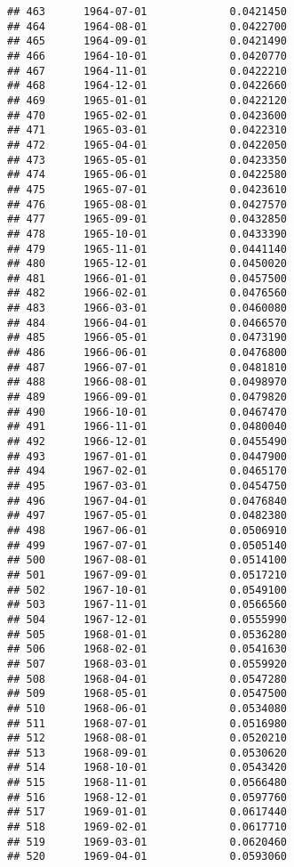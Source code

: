 \documentclass[
]{article}
\begin{document}
\begin{verbatim}
## 463      1964-07-01             0.0421450
## 464      1964-08-01             0.0422700
## 465      1964-09-01             0.0421490
## 466      1964-10-01             0.0420770
## 467      1964-11-01             0.0422210
## 468      1964-12-01             0.0422660
## 469      1965-01-01             0.0422120
## 470      1965-02-01             0.0423600
## 471      1965-03-01             0.0422310
## 472      1965-04-01             0.0422050
## 473      1965-05-01             0.0423350
## 474      1965-06-01             0.0422580
## 475      1965-07-01             0.0423610
## 476      1965-08-01             0.0427570
## 477      1965-09-01             0.0432850
## 478      1965-10-01             0.0433390
## 479      1965-11-01             0.0441140
## 480      1965-12-01             0.0450020
## 481      1966-01-01             0.0457500
## 482      1966-02-01             0.0476560
## 483      1966-03-01             0.0460080
## 484      1966-04-01             0.0466570
## 485      1966-05-01             0.0473190
## 486      1966-06-01             0.0476800
## 487      1966-07-01             0.0481810
## 488      1966-08-01             0.0498970
## 489      1966-09-01             0.0479820
## 490      1966-10-01             0.0467470
## 491      1966-11-01             0.0480040
## 492      1966-12-01             0.0455490
## 493      1967-01-01             0.0447900
## 494      1967-02-01             0.0465170
## 495      1967-03-01             0.0454750
## 496      1967-04-01             0.0476840
## 497      1967-05-01             0.0482380
## 498      1967-06-01             0.0506910
## 499      1967-07-01             0.0505140
## 500      1967-08-01             0.0514100
## 501      1967-09-01             0.0517210
## 502      1967-10-01             0.0549100
## 503      1967-11-01             0.0566560
## 504      1967-12-01             0.0555990
## 505      1968-01-01             0.0536280
## 506      1968-02-01             0.0541630
## 507      1968-03-01             0.0559920
## 508      1968-04-01             0.0547280
## 509      1968-05-01             0.0547500
## 510      1968-06-01             0.0534080
## 511      1968-07-01             0.0516980
## 512      1968-08-01             0.0520210
## 513      1968-09-01             0.0530620
## 514      1968-10-01             0.0543420
## 515      1968-11-01             0.0566480
## 516      1968-12-01             0.0597760
## 517      1969-01-01             0.0617440
## 518      1969-02-01             0.0617710
## 519      1969-03-01             0.0620460
## 520      1969-04-01             0.0593060

\end{verbatim}
\end{document}

